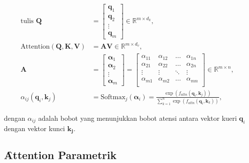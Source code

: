 	\begin{align}
		\label{equ:soft-attention-matrix-start}
		\text{tulis }\mathbf{Q} &= \begin{bmatrix}
			\mathbf{q}_1 \\
			\mathbf{q}_2 \\
			\vdots \\
			\mathbf{q}_m
		\end{bmatrix} \in \mathbb{R}^{m \times d_k}, \\
		\text{Attention}(\mathbf{Q}, \mathbf{K}, \mathbf{V}) &= \mathbf{A} \mathbf{V} \in \mathbb{R}^{m \times d_v},\\
		\mathbf{A} &= \begin{bmatrix}
			\bm{\alpha}_1 \\
			\bm{\alpha}_2 \\
			\vdots \\
			\bm{\alpha}_m
		\end{bmatrix} = \begin{bmatrix}
			\alpha_{11} & \alpha_{12} & \dots & \alpha_{1n} \\
			\alpha_{21} & \alpha_{22} & \dots & \alpha_{2n} \\
			\vdots & \vdots & \ddots & \vdots \\
			\alpha_{m1} & \alpha_{m2} & \dots & \alpha_{mn} \\
		\end{bmatrix} \in \mathbb{R}^{m \times n}, \\
		\label{equ:soft-attention-matrix-end}
		\alpha_{ij}(\mathbf{q}_i, \mathbf{k}_j) &= \text{Softmax}_j(\mathbf{\alpha}_i) = \frac{\exp(f_{attn}(\mathbf{q}_i, \mathbf{k}_j))}{\sum_{k=1}^{n} \exp(f_{attn}(\mathbf{q}_i, \mathbf{k}_k))},
	\end{align}

	dengan $\alpha_{ij}$ adalah bobot yang menunjukkan bobot atensi antara vektor kueri $\mathbf{q}_i$ dengan vektor kunci $\mathbf{k_j}$. 

	\subsection{\f{Attention} Parametrik}

